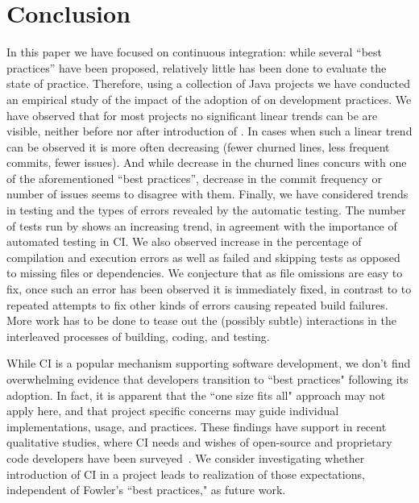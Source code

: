 
\section{Conclusion}
\label{sec:conc}

In this paper we have focused on continuous integration: while several ``best 
practices'' have been proposed, relatively little has been done to evaluate the 
state of practice.
Therefore, using a collection of Java \GH projects we have conducted an 
empirical study of the impact of the adoption of \Tvis on development practices.
We have observed that for most projects no significant linear trends can be 
are visible, neither before nor after introduction of \Tvis.
In cases when such a linear trend can be observed it is more often decreasing 
(fewer churned lines, less frequent commits, fewer issues). 
And while decrease in the churned lines concurs with one of the aforementioned 
``best practices'', decrease in the commit frequency or number of issues seems 
to disagree with them. 
Finally, we have considered trends in testing and the types of errors revealed 
by the automatic testing.
The number of tests run by \Tvis shows an increasing trend, 
in agreement with the importance of automated testing in CI.
We also observed increase in the percentage of compilation and execution errors 
as well as failed and skipping tests as opposed to missing files or dependencies.
We conjecture that as file omissions are easy to fix, once such an error has been 
observed it is immediately fixed, in contrast to to repeated attempts to fix other 
kinds of errors causing repeated build failures.
More work has to be done to tease out the (possibly subtle) interactions in the 
interleaved processes of building, coding, and testing.

While CI is a popular mechanism supporting software development, we don't 
find overwhelming evidence that developers transition to ``best practices" 
following its adoption.
In fact, it is apparent that the ``one size fits all" approach may not apply here, 
and that project specific concerns may guide individual implementations, usage, 
and practices.
These findings have support in recent qualitative studies, where CI needs and 
wishes of open-source and proprietary code developers have been surveyed~\cite{Hilton2016, hilton2016continuous}.
We consider investigating whether introduction of CI in a project leads to 
realization of those expectations, independent of Fowler's ``best practices," 
as future work.

